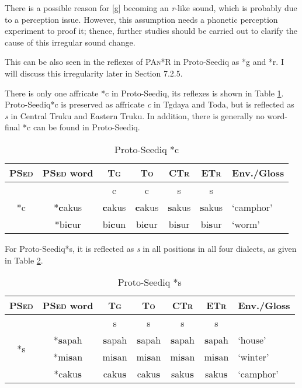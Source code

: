 \documentclass[12pt]{article}
\newcommand{\pan}{\textsc{PAn}\xspace}
\newcommand{\psed}{\textsc{PSed}\xspace}
\newcommand{\psedf}{Proto-Seediq\xspace}
\newcommand{\stg}{\textsc{Tg}\xspace}
\newcommand{\stgf}{Tgdaya\xspace}
\newcommand{\sto}{\textsc{To}\xspace}
\newcommand{\stof}{Toda\xspace}
\newcommand{\sctr}{\textsc{CTr}\xspace}
\newcommand{\sctrf}{Central Truku\xspace}
\newcommand{\setr}{\textsc{ETr}\xspace}
\newcommand{\setrf}{Eastern Truku\xspace}
\begin{document}
There is a possible reason for [g] becoming an \textit{r}-like sound, which is probably due to a perception issue. However, this assumption needs a phonetic perception experiment to proof it; thence, further studies should be carried out to clarify the cause of this irregular sound change. 

This can be also seen in the reflexes of \pan *R in \psedf as *g and *r. I will discuss this irregularity later in Section 7.2.5.

There is only one affricate *c in \psedf, its reflexes is shown in Table \ref{tab:c}. \psedf *c is preserved as affricate \textit{c} in \stgf and \stof, but is reflected as \textit{s} in \sctrf and \setrf. In addition, there is generally no word-final *c can be found in \psedf.

\begin{table}[!htbp]
\centering
\caption{Proto-Seediq *c}
\label{tab:c}
\begin{tabular}{c|c|cccc|l}
\textbf{\psed} & \textbf{\psed word}      & \textbf{\stg} & \textbf{\sto} & \textbf{\sctr} & \textbf{\setr} & \multicolumn{1}{c}{\textbf{Env./Gloss}} \\ \hline
\multirow{3}{*}{*c} & & c   & c   & s   & s   &  \\ \cline{2-7}
    & *\textbf{c}akus & \textbf{c}akus & \textbf{c}akus & \textbf{s}akus & \textbf{s}akus & `camphor' \\
    & *bi\textbf{c}ur & bi\textbf{c}un & bi\textbf{c}ur & bi\textbf{s}ur & bi\textbf{s}ur & `worm' \\ \hline
\end{tabular}
\end{table}

For \psedf *s, it is reflected as \textit{s} in all positions in all four dialects, as given in Table \ref{tab:s}. 

\begin{table}[!htbp]
\centering
\caption{Proto-Seediq *s}
\label{tab:s}
\begin{tabular}{c|c|cccc|l}
\textbf{\psed} & \textbf{\psed word}      & \textbf{\stg} & \textbf{\sto} & \textbf{\sctr} & \textbf{\setr} & \multicolumn{1}{c}{\textbf{Env./Gloss}} \\ \hline
\multirow{4}{*}{*s} & & s & s & s & s &  \\ \cline{2-7}
                    & *\textbf{s}apah & \textbf{s}apah & \textbf{s}apah & \textbf{s}apah & \textbf{s}apah & `house' \\
                    & *mi\textbf{s}an & mi\textbf{s}an & mi\textbf{s}an & mi\textbf{s}an & mi\textbf{s}an & `winter' \\
                    & *caku\textbf{s} & caku\textbf{s} & caku\textbf{s} & saku\textbf{s} & saku\textbf{s} & `camphor' \\ \hline
\end{tabular}
\end{table}
\end{document}
